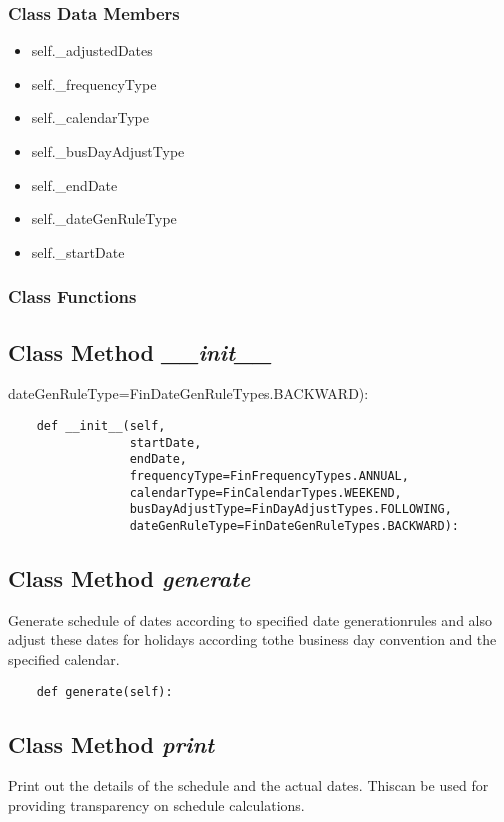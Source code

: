 \documentclass[twoside,11pt]{book}
\begin{document}
\subsubsection{Class Data Members}
\begin{itemize}
\item{self.\_adjustedDates}
\item{self.\_frequencyType}
\item{self.\_calendarType}
\item{self.\_busDayAdjustType}
\item{self.\_endDate}
\item{self.\_dateGenRuleType}
\item{self.\_startDate}
\end{itemize}

\subsubsection{Class Functions}

\subsection{Class Method {\it \_\_init\_\_}}
dateGenRuleType=FinDateGenRuleTypes.BACKWARD):

\begin{lstlisting}
    def __init__(self,
                 startDate,
                 endDate,
                 frequencyType=FinFrequencyTypes.ANNUAL,
                 calendarType=FinCalendarTypes.WEEKEND,
                 busDayAdjustType=FinDayAdjustTypes.FOLLOWING,
                 dateGenRuleType=FinDateGenRuleTypes.BACKWARD):
\end{lstlisting}

\subsection{Class Method {\it generate}}
Generate schedule of dates according to specified date generationrules and also adjust these dates for holidays according tothe business day convention and the specified calendar. 

\begin{lstlisting}
    def generate(self):
\end{lstlisting}

\subsection{Class Method {\it print}}
Print out the details of the schedule and the actual dates. Thiscan be used for providing transparency on schedule calculations. 
\end{document}
